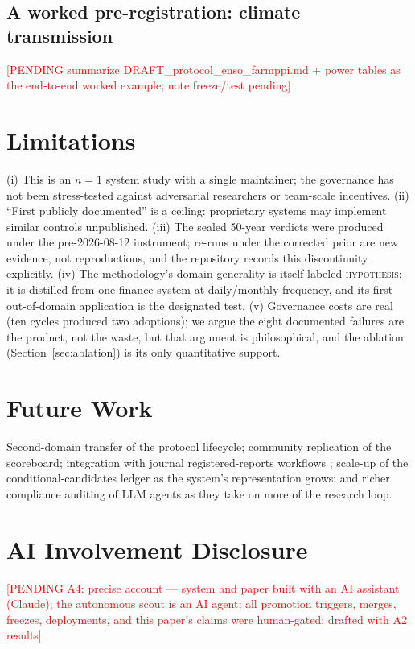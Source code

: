 \documentclass[11pt]{article}
\newcommand{\todoA}[1]{\textcolor{red}{[PENDING #1]}}
\newcommand{\HYPOTHESIS}{\textsc{hypothesis}}
\begin{document}
\subsection{A worked pre-registration: climate transmission}
\label{sec:enso}
\todoA{summarize DRAFT\_protocol\_enso\_farmppi.md + power tables as the
end-to-end worked example; note freeze/test pending}

\section{Limitations}\label{sec:limits}

(i) This is an $n{=}1$ system study with a single maintainer; the
governance has not been stress-tested against adversarial researchers or
team-scale incentives. (ii) ``First publicly documented'' is a ceiling:
proprietary systems may implement similar controls unpublished. (iii)
The sealed 50-year verdicts were produced under the pre-2026-08-12
instrument; re-runs under the corrected prior are new evidence, not
reproductions, and the repository records this discontinuity explicitly.
(iv) The methodology's domain-generality is itself labeled
\HYPOTHESIS{}: it is distilled from one finance system at daily/monthly
frequency, and its first out-of-domain application is the designated
test. (v) Governance costs are real (ten cycles produced two adoptions);
we argue the eight documented failures are the product, not the waste,
but that argument is philosophical, and the ablation
(Section~\ref{sec:ablation}) is its only quantitative support.

\section{Future Work}\label{sec:future}
Second-domain transfer of the protocol lifecycle; community replication
of the scoreboard; integration with journal registered-reports workflows
\citep{bloomfield2018gathering}; scale-up of the conditional-candidates
ledger as the system's representation grows; and richer compliance
auditing of LLM agents as they take on more of the research loop.

\section{AI Involvement Disclosure}\label{sec:ai}
\todoA{A4: precise account --- system and paper built with an AI
assistant (Claude); the autonomous scout is an AI agent; all promotion
triggers, merges, freezes, deployments, and this paper's claims were
human-gated; drafted with A2 results}
\end{document}
